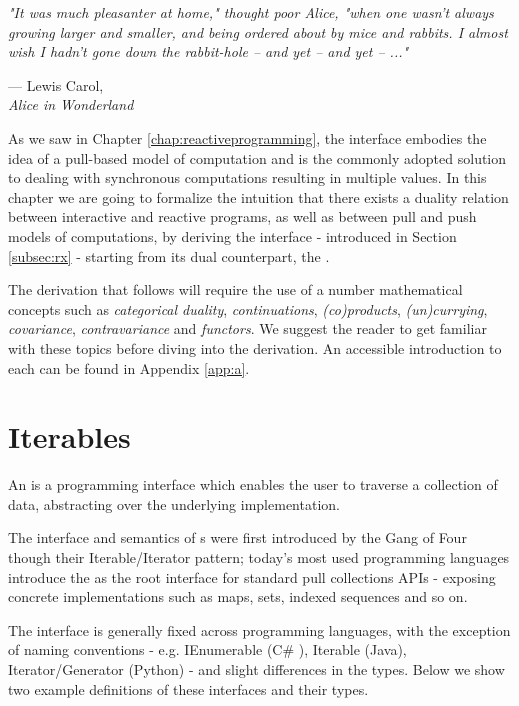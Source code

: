 \let\textcircled=\pgftextcircled
{}

\epigraph{\hspace{4ex}\textit{"It was much pleasanter at home," thought poor Alice, "when one wasn't always growing larger and smaller, and being ordered about by mice and rabbits. I almost wish I hadn't gone down the rabbit-hole -- and yet -- and yet -- ..."}}{--- Lewis Carol,\\ \textit{Alice in Wonderland}}

As we saw in Chapter \ref{chap:reactiveprogramming}, the  interface embodies the idea of a pull-based model of computation and is the commonly adopted solution to dealing with synchronous computations resulting in multiple values. In this chapter we are going to formalize the intuition that there exists a duality relation between interactive and reactive programs\citep{meijer2010observable}, as well as between pull and push models of computations, by deriving the  interface - introduced in Section \ref{subsec:rx} - starting from its dual counterpart, the .

The derivation that follows will require the use of a number mathematical concepts such as \textit{categorical duality}, \textit{continuations}, \textit{(co)products}, \textit{(un)currying}, \textit{covariance}, \textit{contravariance} and \textit{functors}. We suggest the reader to get familiar with these topics before diving into the derivation. An accessible introduction to each can be found in Appendix \ref{app:a}.

\section{Iterables}
\label{sec:iterables}

An  is a programming interface which enables the user to traverse a collection of data, abstracting over the underlying implementation\cite{gamma1995design}.

The interface and semantics of s were first introduced by the Gang of Four though their Iterable/Iterator pattern\cite{gamma1995design}; today's most used programming languages introduce the  as the root interface for standard pull collections APIs - exposing concrete implementations such as maps, sets, indexed sequences and so on. 

The  interface is generally fixed across programming languages, with the exception of naming conventions - e.g. IEnumerable (C\# ), Iterable (Java), Iterator/Generator (Python) - and slight differences in the types. Below we show two example definitions of these interfaces and their types.

